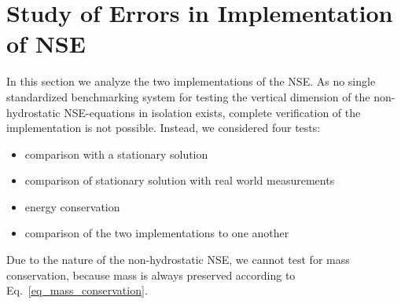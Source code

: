 





\section{Study of Errors in Implementation of NSE}
In this section we analyze the two implementations of the NSE.
As no single standardized benchmarking system for testing the vertical dimension of the non-hydrostatic NSE-equations in isolation exists, complete verification of the implementation is not possible.
Instead, we considered four tests:
\begin{itemize}
\item comparison with a stationary solution
\item comparison of stationary solution with real world measurements
\item energy conservation
\item comparison of the two implementations to one another
\end{itemize}
Due to the nature of the non-hydrostatic NSE, we cannot test for mass conservation, because mass is always preserved according to Eq.~\ref{eq_mass_conservation}.

